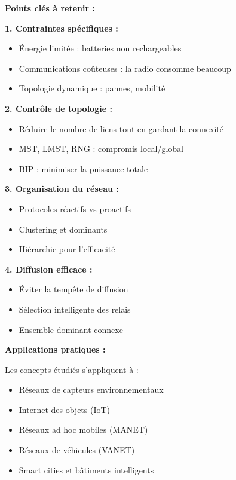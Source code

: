 \documentclass[12pt,a4paper]{article}
\begin{document}
\begin{important}
\textbf{Points clés à retenir :}

\textbf{1. Contraintes spécifiques :}
\begin{itemize}
    \item \textcolor{importantrouge}{Énergie limitée} : batteries non rechargeables
    \item \textcolor{titrebleu}{Communications coûteuses} : la radio consomme beaucoup
    \item \textcolor{defvert}{Topologie dynamique} : pannes, mobilité
\end{itemize}

\textbf{2. Contrôle de topologie :}
\begin{itemize}
    \item Réduire le nombre de liens tout en gardant la connexité
    \item MST, LMST, RNG : compromis local/global
    \item BIP : minimiser la puissance totale
\end{itemize}

\textbf{3. Organisation du réseau :}
\begin{itemize}
    \item Protocoles réactifs vs proactifs
    \item Clustering et dominants
    \item Hiérarchie pour l'efficacité
\end{itemize}

\textbf{4. Diffusion efficace :}
\begin{itemize}
    \item Éviter la tempête de diffusion
    \item Sélection intelligente des relais
    \item Ensemble dominant connexe
\end{itemize}
\end{important}

\begin{astuce}
\textbf{Applications pratiques :}

Les concepts étudiés s'appliquent à :
\begin{itemize}
    \item Réseaux de capteurs environnementaux
    \item Internet des objets (IoT)
    \item Réseaux ad hoc mobiles (MANET)
    \item Réseaux de véhicules (VANET)
    \item Smart cities et bâtiments intelligents
\end{itemize}
\end{astuce}
\end{document}
